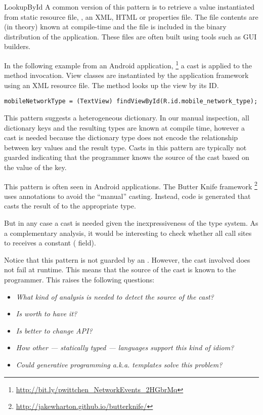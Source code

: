 \begin{pattern}{LookupById}
A common version of this pattern is to retrieve a value instantiated from
static resource file, \eg,
an XML, HTML or \java{} properties file.
The file contents are (in theory) known at compile-time and the file is included in the binary distribution
of the application. These files are often built using tools such as GUI
builders.

In the following example from an Android application,%
\footnote{\url{http://bit.ly/pwittchen_NetworkEvents_2HGbrMq}}
a cast is applied to the  method invocation.
View classes are instantiated by the application framework using an XML resource file.
The  method looks up the view by its ID.

\begin{verbatim}
mobileNetworkType = (TextView) findViewById(R.id.mobile_network_type);
\end{verbatim}

\discussion{}
This pattern suggests a heterogeneous dictionary.
In our manual inspection,
all dictionary keys and the resulting types are known at
compile time, however
a cast is needed because the dictionary type does not encode the
relationship between key values and the result type.
Casts in this pattern are typically not guarded indicating that the programmer
knows the source of the cast based on the value of the key.

This pattern is often seen in Android applications.
The Butter Knife framework%
\footnote{\url{http://jakewharton.github.io/butterknife/}}
uses annotations to avoid the ``manual'' casting.
Instead, code is generated that casts the result of  to the
appropriate type.


But in any case a cast is needed given the inexpressiveness of the type system.
As a complementary analysis,
it would be interesting to check whether all call sites to
 receives a constant ( field).

Notice that this pattern is not guarded by an .
However, the cast involved does not fail at runtime.
This means that the source of the cast is known to the programmer.
This raises the following questions:
\begin{itemize}
\item \emph{What kind of analysis is needed to detect the source of the cast?}
\item \emph{Is worth to have it?}
\item \emph{Is better to change API?}
\item \emph{How other --- statically typed --- languages support this kind of idiom?}
\item \emph{Could generative programming a.k.a. templates solve this problem?}
\end{itemize}


\end{pattern}
